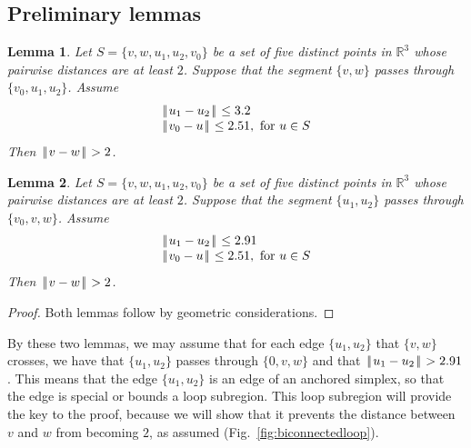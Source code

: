 \documentclass[11pt]{amsart}
\newcommand{\ring}[1]{\mathbb{#1}}
\def\text{\hbox}
\def\|{{\hskip0.1em|\hskip-0.15em|\hskip0.1em}}
\newtheorem{lemma}{Lemma}
\begin{document}
\subsection*{Preliminary lemmas}

\begin{lemma}\label{lemma:prelim}  Let $S=\{v,w,u_1,u_2,v_0\}$ be a set of five distinct points in $\ring{R}^3$ whose
pairwise distances are at least $2$. Suppose that the segment $\{v,w\}$ passes through
$\{v_0,u_1,u_2\}$. Assume
$$
\begin{array}{lll}
\|u_1-u_2\|\le 3.2\\
\|v_0-u\|\le 2.51,\text{ for } u \in S\\
\end{array}
$$
Then $\|v-w\|>2$.
\end{lemma}

\begin{lemma}\label{lemma:291}  Let $S=\{v,w,u_1,u_2,v_0\}$ be a set of five distinct points in $\ring{R}^3$ whose
pairwise distances are at least $2$. Suppose that the segment $\{u_1,u_2\}$ passes through
$\{v_0,v,w\}$. Assume
$$
\begin{array}{lll}
\|u_1-u_2\|\le 2.91\\
\|v_0-u\|\le 2.51,\text{ for } u \in S\\
\end{array}
$$
Then $\|v-w\|>2$.
\end{lemma}



\begin{proof} Both lemmas follow by geometric considerations.
\end{proof}

By these two lemmas, we may assume that for each edge $\{u_1,u_2\}$ that $\{v,w\}$ crosses,
we have that $\{u_1,u_2\}$ passes through $\{0,v,w\}$ and that $\|u_1-u_2\|>2.91$.  This means that the edge $\{u_1,u_2\}$ is an edge of an anchored simplex,
so that the edge is special or bounds a loop subregion.
This loop subregion will provide the key to the proof, because we will show
that it prevents the distance between $v$ and $w$ from becoming $2$,
as assumed  (Fig.~\ref{fig:biconnectedloop}).
\end{document}
